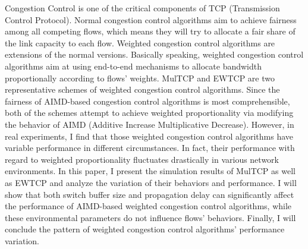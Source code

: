 \documentclass[winfonts]{njuthesis}
\begin{document}
\begin{englishabstract}
  Congestion Control is one of the critical components of TCP (Transmission Control Protocol). Normal congestion control algorithms aim to achieve fairness among all competing flows, which means they will try to allocate a fair share of the link capacity to each flow. Weighted congestion control algorithms are extensions of the normal versions. Basically speaking, weighted congestion control algorithms aim at using end-to-end mechanisms to allocate bandwidth proportionally according to flows’ weights. MulTCP and EWTCP are two representative schemes of weighted congestion control algorithms. Since the fairness of AIMD-based congestion control algorithms is most comprehensible, both of the schemes attempt to achieve weighted proportionality via modifying the behavior of AIMD (Additive Increase Multiplicative Decrease). However, in real experiments, I find that those weighted congestion control algorithms have variable performance in different circumstances. In fact, their performance with regard to weighted proportionality fluctuates drastically in various network environments. In this paper, I present the simulation results of MulTCP as well as EWTCP and analyze the variation of their behaviors and performance. I will show that both switch buffer size and propagation delay can significantly affect the performance of AIMD-based weighted congestion control algorithms, while these environmental parameters do not influence flows’ behaviors. Finally, I will conclude the pattern of weighted congestion control algorithms’ performance variation. 
\end{englishabstract}

%
%
%
%

\tableofcontents
\end{document}
